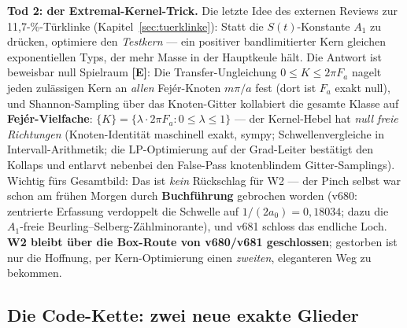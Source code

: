 \documentclass[11pt,a4paper]{article}
\newcommand{\E}{\textcolor{gut}{\textbf{[E]}}}
\begin{document}
\textbf{Tod 2: der Extremal-Kernel-Trick.} Die letzte Idee des
externen Reviews zur 11{,}7-\%-Türklinke
(Kapitel~\ref{sec:tuerklinke}): Statt die $S(t)$-Konstante $A_1$ zu
drücken, optimiere den \emph{Testkern} --- ein positiver
bandlimitierter Kern gleichen exponentiellen Typs, der mehr Masse in
der Hauptkeule hält. Die Antwort ist beweisbar null Spielraum \E{}:
Die Transfer-Ungleichung $0 \le K \le 2\pi F_a$ nagelt jeden
zulässigen Kern an \emph{allen} Fejér-Knoten $m\pi/a$ fest
(dort ist $F_a$ exakt null), und Shannon-Sampling über das
Knoten-Gitter kollabiert die gesamte Klasse auf
\textbf{Fejér-Vielfache}: $\{K\} = \{\lambda \cdot 2\pi F_a : 0 \le
\lambda \le 1\}$ --- der Kernel-Hebel hat \emph{null freie
Richtungen} (Knoten-Identität maschinell exakt, sympy;
Schwellenvergleiche in Intervall-Arithmetik; die LP-Optimierung auf
der Grad-Leiter bestätigt den Kollaps und entlarvt nebenbei den
False-Pass knotenblindem Gitter-Samplings). Wichtig fürs
Gesamtbild: Das ist \emph{kein} Rückschlag für W2 --- der Pinch
selbst war schon am frühen Morgen durch \textbf{Buchführung}
gebrochen worden (v680: zentrierte Erfassung verdoppelt die Schwelle
auf $1/(2a_0) = 0{,}18034$; dazu die $A_1$-freie
Beurling--Selberg-Zählminorante), und v681 schloss das endliche
Loch. \textbf{W2 bleibt über die Box-Route von v680/v681
geschlossen}; gestorben ist nur die Hoffnung, per Kern-Optimierung
einen \emph{zweiten}, eleganteren Weg zu bekommen.

\subsection*{Die Code-Kette: zwei neue exakte Glieder}
\end{document}

